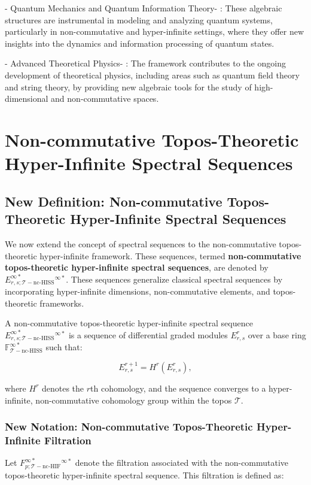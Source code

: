\documentclass{article}
\begin{document}
-  Quantum Mechanics and Quantum Information Theory- : These algebraic structures are instrumental in modeling and analyzing quantum systems, particularly in non-commutative and hyper-infinite settings, where they offer new insights into the dynamics and information processing of quantum states.

-  Advanced Theoretical Physics- : The framework contributes to the ongoing development of theoretical physics, including areas such as quantum field theory and string theory, by providing new algebraic tools for the study of high-dimensional and non-commutative spaces.


\section{Non-commutative Topos-Theoretic Hyper-Infinite Spectral Sequences}
\subsection{New Definition: Non-commutative Topos-Theoretic Hyper-Infinite Spectral Sequences}
We now extend the concept of spectral sequences to the non-commutative topos-theoretic hyper-infinite framework. These sequences, termed \textbf{non-commutative topos-theoretic hyper-infinite spectral sequences}, are denoted by \(E^{\infty *}_{r, s; \mathcal{T}-\text{nc-HISS}}^{\infty *}\). These sequences generalize classical spectral sequences by incorporating hyper-infinite dimensions, non-commutative elements, and topos-theoretic frameworks.

A non-commutative topos-theoretic hyper-infinite spectral sequence \(E^{\infty *}_{r, s; \mathcal{T}-\text{nc-HISS}}^{\infty *}\) is a sequence of differential graded modules \(E^{r}_{r, s}\) over a base ring \(\mathbb{F}_{\mathcal{T}-\text{nc-HISS}}^{\infty *}\) such that:

\[
E^{r+1}_{r, s} = H^r(E^{r}_{r, s}),
\]

where \(H^r\) denotes the \(r\)th cohomology, and the sequence converges to a hyper-infinite, non-commutative cohomology group within the topos \(\mathcal{T}\).

\subsubsection{New Notation: Non-commutative Topos-Theoretic Hyper-Infinite Filtration}
Let \(F^{\infty *}_{p; \mathcal{T}-\text{nc-HIF}}^{\infty *}\) denote the filtration associated with the non-commutative topos-theoretic hyper-infinite spectral sequence. This filtration is defined as:
\end{document}
